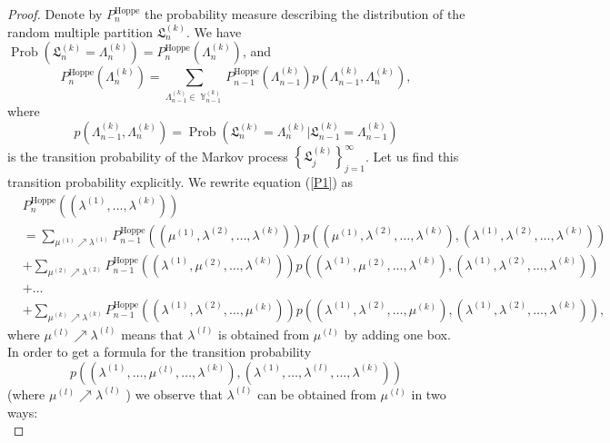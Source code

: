 \documentclass[12pt]{amsart}
\theoremstyle{definition}
\numberwithin{equation}{section}
\DeclareMathOperator{\Prob}{Prob}
\DeclareMathOperator{\Y}{\mathbb{Y}}
\DeclareMathOperator{\Hoppe}{Hoppe}
\begin{document}
\begin{proof}
Denote by $P_{n}^{\Hoppe}$ the probability measure describing the distribution of the random multiple
partition $\mathfrak{L}_n^{(k)}$. We have $\Prob\left(\mathfrak{L}_n^{(k)}=\Lambda_n^{(k)}\right)=P_n^{\Hoppe}(\Lambda_n^{(k)})$, and
\begin{equation}\label{P1}
P_n^{\Hoppe}\left(\Lambda_n^{(k)}\right)=\sum\limits_{\Lambda_{n-1}^{(k)}\in\Y_{n-1}^{(k)}}
P^{\Hoppe}_{n-1}\left(\Lambda_{n-1}^{(k)}\right)p\left(\Lambda_{n-1}^{(k)},\Lambda_n^{(k)}\right),
\end{equation}
where
$$
p\left(\Lambda_{n-1}^{(k)},\Lambda_n^{(k)}\right)
=\Prob\left(\mathfrak{L}_n^{(k)}=\Lambda_n^{(k)}|\mathfrak{L}_{n-1}^{(k)}=\Lambda_{n-1}^{(k)}\right)
$$
is the transition probability of the Markov process $\left\{\mathfrak{L}_j^{(k)}\right\}_{j=1}^{\infty}$. Let us find this transition probability explicitly.
We rewrite equation (\ref{P1}) as
\begin{equation}
\begin{split}
&P^{\Hoppe}_n\left(\left(\lambda^{(1)},\ldots,\lambda^{(k)}\right)\right)\\
&=\sum\limits_{\mu^{(1)}\nearrow\lambda^{(1)}}P_{n-1}^{\Hoppe}\left(\left(\mu^{(1)},\lambda^{(2)},\ldots,\lambda^{(k)}\right)\right)
p\left(\left(\mu^{(1)},\lambda^{(2)},\ldots,\lambda^{(k)}\right),\left(\lambda^{(1)},\lambda^{(2)},\ldots,\lambda^{(k)}\right)\right)\\
&+\sum\limits_{\mu^{(2)}\nearrow\lambda^{(2)}}P_{n-1}^{\Hoppe}\left(\left(\lambda^{(1)},\mu^{(2)},\ldots,\lambda^{(k)}\right)\right)
p\left(\left(\lambda^{(1)},\mu^{(2)},\ldots,\lambda^{(k)}\right),\left(\lambda^{(1)},\lambda^{(2)},\ldots,\lambda^{(k)}\right)\right)\\
&+\ldots\\
&+\sum\limits_{\mu^{(k)}\nearrow\lambda^{(k)}}P_{n-1}^{\Hoppe}\left(\left(\lambda^{(1)},\lambda^{(2)},\ldots,\mu^{(k)}\right)\right)
p\left(\left(\lambda^{(1)},\lambda^{(2)},\ldots,\mu^{(k)}\right),\left(\lambda^{(1)},\lambda^{(2)},\ldots,\lambda^{(k)}\right)\right),
\end{split}
\end{equation}
where $\mu^{(l)}\nearrow\lambda^{(l)}$ means that $\lambda^{(l)}$ is obtained from $\mu^{(l)}$ by adding one box.
In order to get a formula for the transition probability
$$
p\left(\left(\lambda^{(1)},\ldots,\mu^{(l)},\ldots,\lambda^{(k)}\right),\left(\lambda^{(1)},\ldots,\lambda^{(l)},\ldots,\lambda^{(k)}\right)\right)
$$
(where $\mu^{(l)}\nearrow\lambda^{(l)}$ ) we observe that $\lambda^{(l)}$ can be obtained from $\mu^{(l)}$ in two ways:\\

\end{proof}
\end{document}

